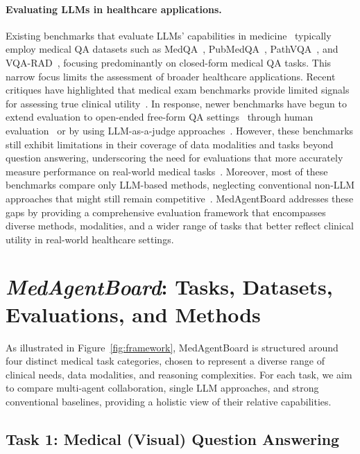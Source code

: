 \documentclass{article}
\begin{document}
\paragraph{Evaluating LLMs in healthcare applications.}
Existing benchmarks that evaluate LLMs' capabilities in medicine~\cite{nori2023capabilities,singhal2023large} typically employ medical QA datasets such as MedQA~\cite{jin2021medqa}, PubMedQA~\cite{jin2019pubmedqa}, PathVQA~\cite{he2020pathvqa}, and VQA-RAD~\cite{lau2018VQA_RAD}, focusing predominantly on closed-form medical QA tasks. This narrow focus limits the assessment of broader healthcare applications. Recent critiques have highlighted that medical exam benchmarks provide limited signals for assessing true clinical utility~\cite{inioluwa2025timetobench}. In response, newer benchmarks have begun to extend evaluation to open-ended free-form QA settings~\cite{singhal2025toward} through human evaluation~\cite{tam2024framework} or by using LLM-as-a-judge approaches~\cite{zheng2023llm_as_a_judge}. However, these benchmarks still exhibit limitations in their coverage of data modalities and tasks beyond question answering, underscoring the need for evaluations that more accurately measure performance on real-world medical tasks~\cite{shah2025MedHELM}. Moreover, most of these benchmarks compare only LLM-based methods, neglecting conventional non-LLM approaches that might still remain competitive~\cite{zhu2024clinicrealm}. MedAgentBoard addresses these gaps by providing a comprehensive evaluation framework that encompasses diverse methods, modalities, and a wider range of tasks that better reflect clinical utility in real-world healthcare settings.

\section{\textit{MedAgentBoard}: Tasks, Datasets, Evaluations, and Methods}
\label{sec:medagentboard_framework}

As illustrated in Figure~\ref{fig:framework}, MedAgentBoard is structured around four distinct medical task categories, chosen to represent a diverse range of clinical needs, data modalities, and reasoning complexities. For each task, we aim to compare multi-agent collaboration, single LLM approaches, and strong conventional baselines, providing a holistic view of their relative capabilities.

\subsection{Task 1: Medical (Visual) Question Answering}
\label{subsec:task_medvqa}
\end{document}
